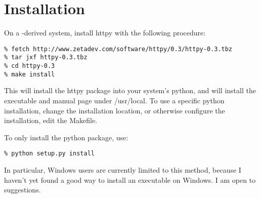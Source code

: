 \chapter{Installation}

On a \UNIX-derived system, install httpy with the following procedure:

\begin{verbatim}
% fetch http://www.zetadev.com/software/httpy/0.3/httpy-0.3.tbz
% tar jxf httpy-0.3.tbz
% cd httpy-0.3
% make install
\end{verbatim}

This will install the httpy package into your system's python, and will install
the executable and manual page under /usr/local. To use a specific python
installation, change the installation location, or otherwise configure the
installation, edit the Makefile.

To only install the python package, use:

\begin{verbatim}
% python setup.py install
\end{verbatim}

In particular, Windows users are currently limited to this method, because I
haven't yet found a good way to install an executable on Windows. I am open to
suggestions.
